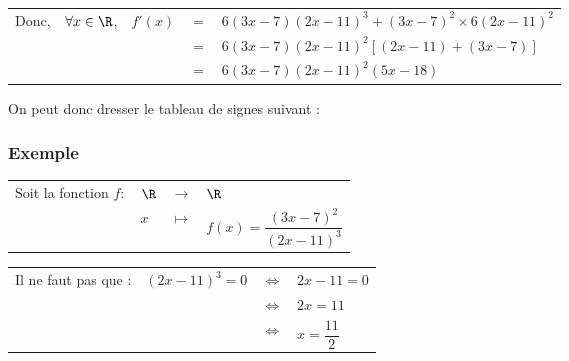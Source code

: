 \vspace*{.3cm}

\begin{tabular}{lllll}
Donc, & $\forall x \in \R$, & $f'(x)$ & $=$ & $6\left(3x -7\right)\left(2x-11\right)^3 + \left(3x - 7\right)^2 \times 6\left(2x - 11\right)^2$ \\
& & & $=$ & $6\left(3x - 7\right)\left(2x-11\right)^2\left[\left(2x-11\right)+\left(3x - 7\right)\right]$ \\
& & & $=$ & $6\left(3x - 7\right)\left(2x-11\right)^2\left(5x - 18\right)$ \\
\end{tabular}

\vspace*{.3cm}

On peut donc dresser le tableau de signes suivant : \\


\vspace*{.3cm}

\newpage

\subsubsection{Exemple }

\begin{tabular}{llll}
Soit la fonction $f :$ & $\R$ & $\longrightarrow$ & $\R$ \\
& $x$ & $\longmapsto$ & $f(x) = \dfrac{\left(3x - 7\right)^2}{\left(2x - 11\right)^3}$ \\
\end{tabular}

\vspace*{.3cm}

\begin{tabular}{lrll}
Il ne faut pas que : & $\left(2x - 11\right)^3 = 0$ & $\Longleftrightarrow$ & $2x - 11 = 0$ \\
& & $\Longleftrightarrow$ & $2x = 11$ \\
& & $\Longleftrightarrow$ & $x = \dfrac{11}{2}$ \\
\end{tabular}

